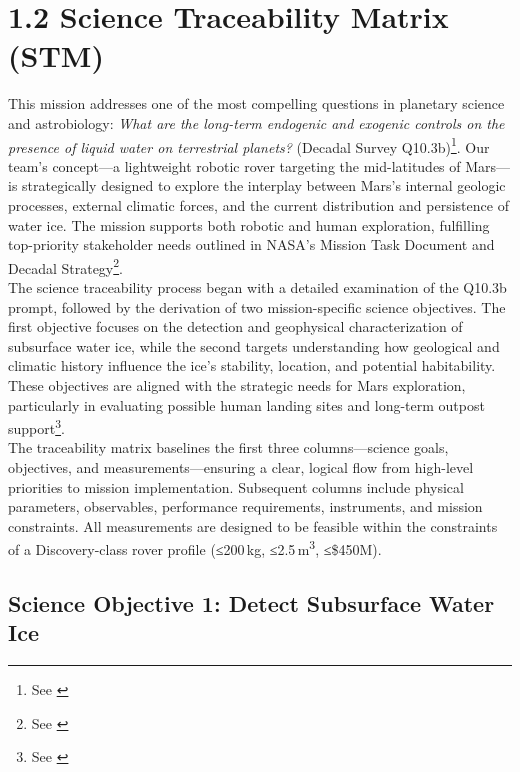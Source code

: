 \section*{1.2 Science Traceability Matrix (STM)}

This mission addresses one of the most compelling questions in planetary science and astrobiology: \textit{What are the long-term endogenic and exogenic controls on the presence of liquid water on terrestrial planets?} (Decadal Survey Q10.3b)\footnote{See \cite{nrc_2022_decadal}}. Our team’s concept—a lightweight robotic rover targeting the mid-latitudes of Mars—is strategically designed to explore the interplay between Mars’s internal geologic processes, external climatic forces, and the current distribution and persistence of water ice. The mission supports both robotic and human exploration, fulfilling top-priority stakeholder needs outlined in NASA’s Mission Task Document and Decadal Strategy\footnote{See \cite{lspace_stm_module, mepag_goals}}. \\

The science traceability process began with a detailed examination of the Q10.3b prompt, followed by the derivation of two mission-specific science objectives. The first objective focuses on the detection and geophysical characterization of subsurface water ice, while the second targets understanding how geological and climatic history influence the ice’s stability, location, and potential habitability. These objectives are aligned with the strategic needs for Mars exploration, particularly in evaluating possible human landing sites and long-term outpost support\footnote{See \cite{nasa_m2m_objectives}}. \\

The traceability matrix baselines the first three columns—science goals, objectives, and measurements—ensuring a clear, logical flow from high-level priorities to mission implementation. Subsequent columns include physical parameters, observables, performance requirements, instruments, and mission constraints. All measurements are designed to be feasible within the constraints of a Discovery-class rover profile (≤200 kg, ≤2.5 m\textsuperscript{3}, ≤\$450M). \\

\subsection*{Science Objective 1: Detect Subsurface Water Ice}

